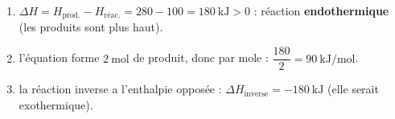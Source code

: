 \documentclass[11pt,a4paper]{article}
\begin{document}
\begin{corrige}
\begin{enumerate}[label=\alph*)]
  \item $\Delta H = H_{\text{prod.}}-H_{\text{réac.}} = 280 - 100 = \qty{+180}{\kilo\joule}>0$ : réaction \textbf{endothermique} (les produits sont plus haut).
  \item l'équation forme $\qty{2}{\mol}$ de produit, donc par mole : $\dfrac{180}{2}=\qty{+90}{\kilo\joule\per\mol}$.
  \item la réaction inverse a l'enthalpie opposée : $\Delta H_{\text{inverse}} = \qty{-180}{\kilo\joule}$ (elle serait exothermique).
\end{enumerate}
\end{corrige}
\end{document}
